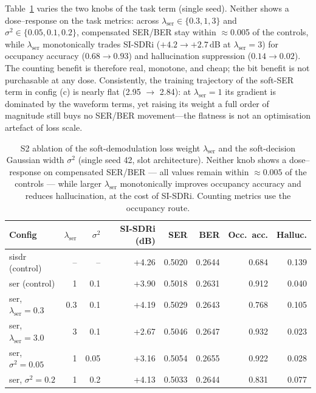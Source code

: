 \documentclass[review,12pt]{elsarticle}
\begin{document}
Table~\ref{tab:s2_ablation} varies the two knobs of the task term
(single seed). Neither shows a dose--response on the task metrics:
across $\lambda_{\mathrm{ser}} \in \{0.3, 1, 3\}$ and
$\sigma^2 \in \{0.05, 0.1, 0.2\}$, compensated SER/BER stay within
$\approx$0.005 of the controls, while $\lambda_{\mathrm{ser}}$
monotonically trades SI-SDRi ($+4.2 \to +2.7$\,dB at
$\lambda_{\mathrm{ser}} = 3$) for occupancy accuracy
($0.68 \to 0.93$) and hallucination suppression ($0.14 \to 0.02$).
The counting benefit is therefore real, monotone, and cheap; the bit
benefit is not purchasable at any dose. Consistently, the training
trajectory of the soft-SER term in config (c) is nearly flat
(2.95 $\to$ 2.84): at $\lambda_{\mathrm{ser}} = 1$ its gradient is
dominated by the waveform terms, yet raising its weight a full order of
magnitude still buys no SER/BER movement---the flatness is not an
optimisation artefact of loss scale.

\begin{table}[H]
\centering
\caption{S2 ablation of the soft-demodulation loss weight $\lambda_{\mathrm{ser}}$ and the soft-decision Gaussian width $\sigma^2$ (single seed 42, slot architecture). Neither knob shows a dose--response on compensated SER/BER --- all values remain within $\approx\!0.005$ of the controls --- while larger $\lambda_{\mathrm{ser}}$ monotonically improves occupancy accuracy and reduces hallucination, at the cost of SI-SDRi. Counting metrics use the occupancy route.}
\label{tab:s2_ablation}
\setlength{\tabcolsep}{3pt}
\footnotesize
\begin{tabular}{l r r r r r r r}
\toprule
Config & $\lambda_{\mathrm{ser}}$ & $\sigma^2$ & SI-SDRi (dB) & SER & BER & Occ.\ acc. & Halluc. \\
\midrule
sisdr (control) & -- & -- & +4.26 & 0.5020 & 0.2644 & 0.684 & 0.139 \\
ser (control) & 1 & 0.1 & +3.90 & 0.5018 & 0.2631 & 0.912 & 0.040 \\
ser, $\lambda_{\mathrm{ser}}{=}0.3$ & 0.3 & 0.1 & +4.19 & 0.5029 & 0.2643 & 0.768 & 0.105 \\
ser, $\lambda_{\mathrm{ser}}{=}3.0$ & 3 & 0.1 & +2.67 & 0.5046 & 0.2647 & 0.932 & 0.023 \\
ser, $\sigma^2{=}0.05$ & 1 & 0.05 & +3.16 & 0.5054 & 0.2655 & 0.922 & 0.028 \\
ser, $\sigma^2{=}0.2$ & 1 & 0.2 & +4.13 & 0.5033 & 0.2644 & 0.831 & 0.077 \\
\bottomrule
\end{tabular}
\end{table}
\end{document}
